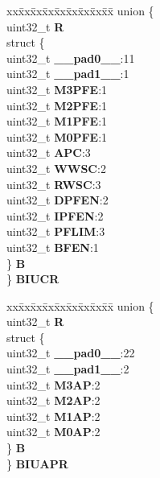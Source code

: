 \begin{DoxyCompactItemize}
\begin{tabbing}
\end{tabbing}\item 
\mbox{\label{structFLASH__tag_af9f03a9c2614238717938d49a03fddd3}} 
\begin{tabbing}
xx\=xx\=xx\=xx\=xx\=xx\=xx\=xx\=xx\=\kill
union \{\\
\>uint32\_t {\bfseries R}\\
\>struct \{\\
\>\>uint32\_t {\bfseries \_\_pad0\_\_}:11\\
\>\>uint32\_t {\bfseries \_\_pad1\_\_}:1\\
\>\>uint32\_t {\bfseries M3PFE}:1\\
\>\>uint32\_t {\bfseries M2PFE}:1\\
\>\>uint32\_t {\bfseries M1PFE}:1\\
\>\>uint32\_t {\bfseries M0PFE}:1\\
\>\>uint32\_t {\bfseries APC}:3\\
\>\>uint32\_t {\bfseries WWSC}:2\\
\>\>uint32\_t {\bfseries RWSC}:3\\
\>\>uint32\_t {\bfseries DPFEN}:2\\
\>\>uint32\_t {\bfseries IPFEN}:2\\
\>\>uint32\_t {\bfseries PFLIM}:3\\
\>\>uint32\_t {\bfseries BFEN}:1\\
\>\} {\bfseries B}\\
\} {\bfseries BIUCR}\\

\end{tabbing}\item 
\mbox{\label{structFLASH__tag_ac3373d40dc3365a26e8f5e467f9fd1b1}} 
\begin{tabbing}
xx\=xx\=xx\=xx\=xx\=xx\=xx\=xx\=xx\=\kill
union \{\\
\>uint32\_t {\bfseries R}\\
\>struct \{\\
\>\>uint32\_t {\bfseries \_\_pad0\_\_}:22\\
\>\>uint32\_t {\bfseries \_\_pad1\_\_}:2\\
\>\>uint32\_t {\bfseries M3AP}:2\\
\>\>uint32\_t {\bfseries M2AP}:2\\
\>\>uint32\_t {\bfseries M1AP}:2\\
\>\>uint32\_t {\bfseries M0AP}:2\\
\>\} {\bfseries B}\\
\} {\bfseries BIUAPR}\\


\end{tabbing}
\end{DoxyCompactItemize}
